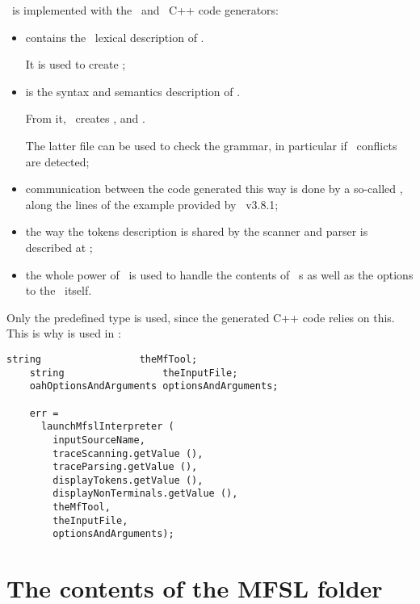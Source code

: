 \mfslLang\ is implemented with the \flex\ and \bison\ C++ code generators:
\begin{itemize}
\item {} contains the \flex\ lexical description of \mfslLang.

It is used to create ;

\item {} is the syntax and semantics description of \mfslLang.

From it, \bison\ creates ,  and .

The latter file can be used to check the grammar, in particular if \LR\ conflicts are detected;

\item communication between the code generated this way is done by a so-called , along the lines of the  example provided by \bison\ v3.8.1;

\item the way the tokens description is shared by the scanner and parser is described at ;

\item the whole power of \oahRepr\ is used to handle the contents of \mfslLang\ \script s as well as the options to the \mfslInterp\ itself.
\end{itemize}

Only the predefined  type is used, since the generated C++ code relies on this. This is why  is used in :
\begin{lstlisting}[language=CPlusPlus]
    string                 theMfTool;
    string                 theInputFile;
    oahOptionsAndArguments optionsAndArguments;

    err =
      launchMfslInterpreter (
        inputSourceName,
        traceScanning.getValue (),
        traceParsing.getValue (),
        displayTokens.getValue (),
        displayNonTerminals.getValue (),
        theMfTool,
        theInputFile,
        optionsAndArguments);
\end{lstlisting}


\section{The contents of the MFSL folder}

